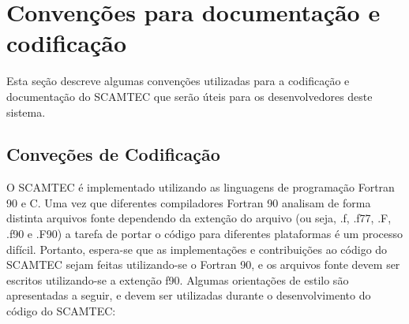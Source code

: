 \chapter{Convenções para documentação e codificação}

Esta seção descreve algumas convenções utilizadas para a codificação e documentação do SCAMTEC que serão úteis para os desenvolvedores deste sistema.

\section{Conveções de Codificação}
\label{sec:codificacao}

O SCAMTEC é implementado utilizando as linguagens de programação Fortran 90 e C. Uma vez que diferentes compiladores Fortran 90 analisam de forma distinta arquivos fonte dependendo da extenção do arquivo (ou seja, .f, .f77, .F, .f90 e .F90) a tarefa de portar o código para diferentes plataformas é um processo difícil. Portanto, espera-se que as implementações e contribuições ao código do SCAMTEC sejam feitas utilizando-se o Fortran 90, e os arquivos fonte devem ser escritos utilizando-se a extenção f90. Algumas orientações de estilo são apresentadas a seguir, e devem ser utilizadas durante o desenvolvimento do código do SCAMTEC:

